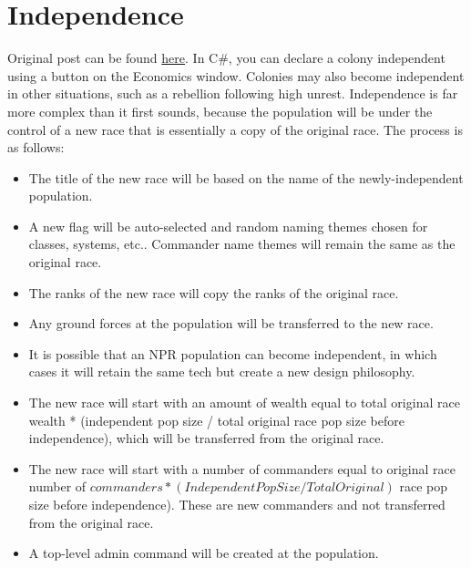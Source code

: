 \documentclass[../Aurora C# unofficial manual.tex]{subfiles}
\begin{document}
	\section{Independence}\label{6_independence}
	Original post can be found
	\href{http://aurora2.pentarch.org/index.php?topic=8495.msg118467#msg118467}{here}.
	\newline\newline
	In C\#, you can declare a colony independent using a button on the Economics window. Colonies may also become independent in other situations, such as a rebellion following high unrest. Independence is far more complex than it first sounds, because the population will be under the control of a new race that is essentially a copy of the original race. The process is as follows:
	\begin{itemize}
		\item The title of the new race will be based on the name of the newly-independent population.
		\item A new flag will be auto-selected and random naming themes chosen for classes, systems, etc.. Commander name themes will remain the same as the original race.
		\item The ranks of the new race will copy the ranks of the original race.
		\item Any ground forces at the population will be transferred to the new race.
		\item It is possible that an NPR population can become independent, in which cases it will retain the same tech but create a new design philosophy.
		\item The new race will start with an amount of wealth equal to total original race wealth * (independent pop size / total original race pop size before independence), which will be transferred from the original race.
		\item The new race will start with a number of commanders equal to original race number of \( commanders * (Independent Pop Size / Total Original) \) race pop size before independence). These are new commanders and not transferred from the original race.
		\item A top-level admin command will be created at the population.
	\end{itemize}
	
\end{document}
